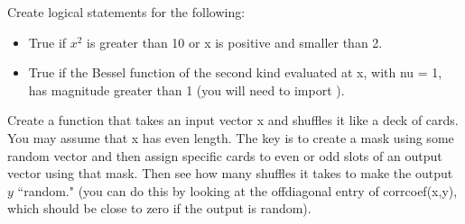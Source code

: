 \begin{problem}
Create logical statements for the following:
\begin{itemize}
\item True if $x^2$ is greater than 10 or x is positive and smaller than 2.
\item True if the Bessel function of the second kind evaluated at x, with nu = 1, has magnitude greater than 1 (you will need to import ).
\end{itemize}
\end{problem}

\begin{problem}
Create a function that takes an input vector x and shuffles it like a deck of cards. You may assume that x has even length. The key is to create a mask using some random vector and then assign specific cards to even or odd slots of an output vector using that mask. Then see how many shuffles it takes to make the output $y$ ``random." (you can do this by looking at the offdiagonal entry of corrcoef(x,y), which should be close to zero if the output is random).
\end{problem}

